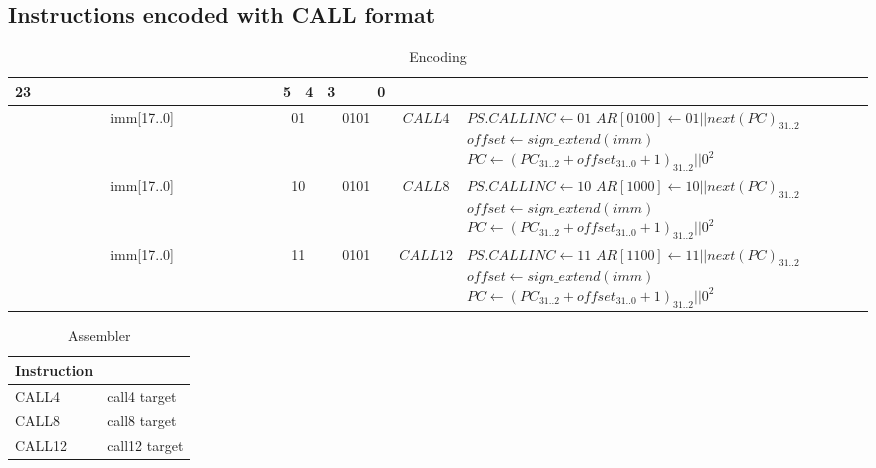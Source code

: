 \newpage

\subsection{Instructions encoded with CALL format}
\begin{longtable}{llllllllllllllllllllllll  p{1cm}  p{7cm} | }
	\caption{Encoding\label{long}}\\
	23 & & & & & & & & & & & & & & & & & & 5 & 4 & 3 & & & 0 & &
	\multicolumn{1}{c}{}\\
	\hline
	\multicolumn{18}{|c|}{imm[17..0]} & \multicolumn{2}{c|}{01} & \multicolumn{4}{c|}{0101} & \multicolumn{1}{c|}{$CALL4$} & $PS.CALLINC \leftarrow {01}$ \newline $AR[0100] \leftarrow 01||next(PC)_{31..2}$ \newline $offset \leftarrow sign\_extend(imm)$ \newline $PC \leftarrow (PC_{31..2}+offset_{31..0}+1)_{31..2}||0^2$\\ \hline
	\multicolumn{18}{|c|}{imm[17..0]} & \multicolumn{2}{c|}{10} & \multicolumn{4}{c|}{0101} & \multicolumn{1}{c|}{$CALL8$} &$PS.CALLINC \leftarrow {10}$ \newline $AR[1000] \leftarrow 10||next(PC)_{31..2}$ \newline $offset \leftarrow sign\_extend(imm)$ \newline $PC \leftarrow (PC_{31..2}+offset_{31..0}+1)_{31..2}||0^2$\\ \hline
	\multicolumn{18}{|c|}{imm[17..0]} & \multicolumn{2}{c|}{11} & \multicolumn{4}{c|}{0101} & \multicolumn{1}{c|}{$CALL12$} & $PS.CALLINC \leftarrow {11}$ \newline $AR[1100] \leftarrow 11||next(PC)_{31..2}$ \newline $offset \leftarrow sign\_extend(imm)$ \newline $PC \leftarrow (PC_{31..2}+offset_{31..0}+1)_{31..2}||0^2$\\ \hline
\end{longtable}

\begin{longtable}{|p{5cm}|p{5cm}|}
	\caption{Assembler\label{long}}\\
	\hline
	Instruction & \\
	\hline
	CALL4 & call4 target\\ \hline
	CALL8 & call8 target\\ \hline
	CALL12 & call12 target\\ \hline
\end{longtable}

